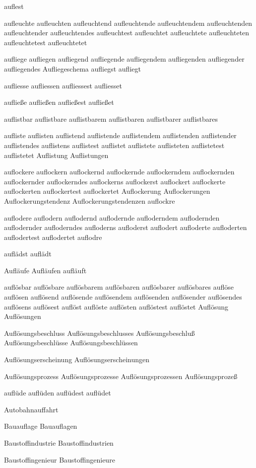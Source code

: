 auflest

aufleuchte aufleuchten aufleuchtend aufleuchtende aufleuchtendem aufleuchtenden aufleuchtender aufleuchtendes aufleuchtest aufleuchtet aufleuchtete aufleuchteten aufleuchtetest aufleuchtetet

aufliege aufliegen aufliegend aufliegende aufliegendem aufliegenden aufliegender aufliegendes Aufliegeschema aufliegst aufliegt

aufliesse aufliessen aufliessest aufliesset

aufließe aufließen aufließest aufließet

auflistbar auflistbare auflistbarem auflistbaren auflistbarer auflistbares 

aufliste auflisten auflistend auflistende auflistendem auflistenden auflistender auflistendes auflistens auflistest auflistet auflistete auflisteten auflistetest auflistetet Auflistung Auflistungen

auflockere auflockern auflockernd auflockernde auflockerndem auflockernden auflockernder auflockerndes auflockerns auflockerst auflockert auflockerte auflockerten auflockertest auflockertet Auflockerung Auflockerungen Auflockerungstendenz Auflockerungstendenzen auflockre

auflodere auflodern auflodernd auflodernde aufloderndem auflodernden auflodernder aufloderndes aufloderns aufloderst auflodert aufloderte aufloderten auflodertest auflodertet auflodre

auflädst auflädt

Aufläufe Aufläufen aufläuft

auflösbar auflösbare auflösbarem auflösbaren auflösbarer auflösbares auflöse auflösen auflösend auflösende auflösendem auflösenden auflösender auflösendes auflösens auflösest auflöst auflöste auflösten auflöstest auflöstet Auflösung Auflösungen 

Auflösungsbeschluss Auflösungsbeschlusses Auflösungsbeschluß Auflösungsbeschlüsse Auflösungsbeschlüssen 

Auflösungserscheinung Auflösungserscheinungen 

Auflösungsprozess Auflösungsprozesse Auflösungsprozessen Auflösungsprozeß

auflüde auflüden auflüdest auflüdet

Autobahnauffahrt

Bauauflage Bauauflagen

Baustoffindustrie Baustoffindustrien

Baustoffingenieur Baustoffingenieure

